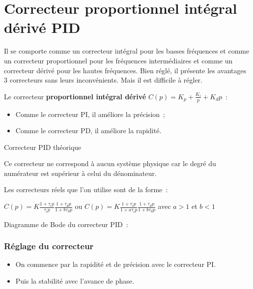 \hypertarget{correcteur-proportionnel-intuxe9gral-duxe9rivuxe9-pid}{%
\section{Correcteur proportionnel intégral dérivé PID}\label{correcteur-proportionnel-intuxe9gral-duxe9rivuxe9-pid}}

\TLBodeCorrecteurPID[1][10][1][0.1]


Il se comporte comme un correcteur intégral pour les basses fréquences et comme un correcteur proportionnel pour les fréquences intermédiaires et comme un correcteur dérivé pour les hautes fréquences. Bien réglé, il présente les avantages 3 correcteurs sans leurs inconvénients. Mais il est difficile à régler.

Le correcteur \textbf{proportionnel intégral dérivé} \(C(p) = K_{p} + \frac{K_{i}}{p} + K_{d}p\)~:

\begin{itemize}
\item
  Comme le correcteur PI, il améliore la précision~;
\item
  Comme le correcteur PD, il améliore la rapidité.
\end{itemize}

Correcteur PID théorique

Ce correcteur ne correspond à aucun système physique car le degré du numérateur est supérieur à celui du dénominateur.

Les correcteurs réels que l'on utilise sont de la forme~:

\(C(p) = K\frac{1 + \tau_{i}p}{\tau_{i}p}\frac{1 + \tau_{d}p}{1 + b\tau_{d}p}\) ou \(C(p) = K\frac{1 + \tau_{i}p}{1 + a\tau_{i}p}\frac{1 + \tau_{d}p}{1 + b\tau_{d}p}\) avec \(a > 1\) et \(b < 1\)

Diagramme de Bode du correcteur PID~:

\hypertarget{ruxe9glage-du-correcteur-3}{%
\subsubsection*{Réglage du correcteur}\label{ruxe9glage-du-correcteur-3}}

\begin{itemize}
\item
  On commence par la rapidité et de précision avec le correcteur PI.
\item
  Puis la stabilité avec l'avance de phase.
\end{itemize}

